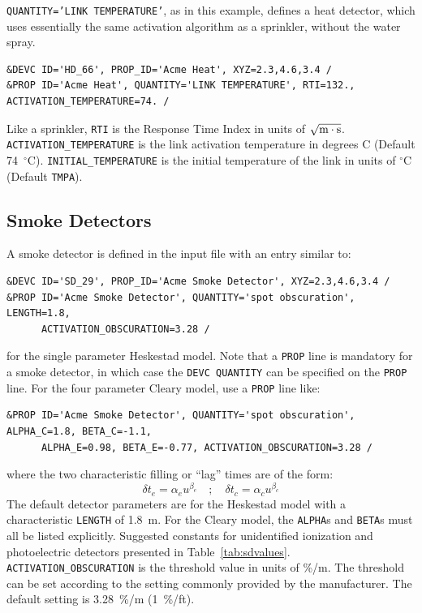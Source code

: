 \documentclass[11pt]{book}
\newcommand{\ct}{\tt\small}
\newcommand{\be}{\begin{equation}}
\newcommand{\ee}{\end{equation}}
\begin{document}
{\ct QUANTITY='LINK TEMPERATURE'}, as in this example, defines a heat detector, which uses essentially the same activation algorithm as a sprinkler, without the water spray.

\footnotesize
\begin{verbatim}
&DEVC ID='HD_66', PROP_ID='Acme Heat', XYZ=2.3,4.6,3.4 /
&PROP ID='Acme Heat', QUANTITY='LINK TEMPERATURE', RTI=132., ACTIVATION_TEMPERATURE=74. /
\end{verbatim}

\normalsize
\noindent
Like a sprinkler, {\ct RTI} is the Response Time Index in units of
$\sqrt{\hbox{m}\cdot \hbox{s}}$.
{\ct ACTIVATION\_TEMPERATURE} is the link activation temperature in degrees C (Default 74~$^\circ$C).
{\ct INITIAL\_TEMPERATURE} is the initial temperature of the link in units of $^\circ$C (Default {\ct TMPA}).



\subsection{Smoke Detectors}
\label{info:smoke_detector}

A smoke detector is defined in the input file with an entry similar to:

\footnotesize
\begin{verbatim}
&DEVC ID='SD_29', PROP_ID='Acme Smoke Detector', XYZ=2.3,4.6,3.4 /
&PROP ID='Acme Smoke Detector', QUANTITY='spot obscuration', LENGTH=1.8,
      ACTIVATION_OBSCURATION=3.28 /
\end{verbatim}

\normalsize
\noindent
for the single parameter Heskestad model. Note that a {\ct PROP} line is mandatory for a smoke detector, in which case the
{\ct DEVC QUANTITY} can be specified on the {\ct PROP} line. For the four parameter Cleary model, use a {\ct PROP} line like:

\footnotesize
\begin{verbatim}
&PROP ID='Acme Smoke Detector', QUANTITY='spot obscuration', ALPHA_C=1.8, BETA_C=-1.1,
      ALPHA_E=0.98, BETA_E=-0.77, ACTIVATION_OBSCURATION=3.28 /
\end{verbatim}

\normalsize
\noindent
where the two characteristic filling or ``lag'' times are of the form:
\be \delta t_e = \alpha_e u^{\beta_e} \quad ; \quad \delta t_c = \alpha_c u^{\beta_c} \ee
The default detector parameters are for the Heskestad model with a characteristic {\ct LENGTH} of
1.8~m. For the Cleary model, the {\ct ALPHA}s and {\ct BETA}s must all be listed explicitly.
Suggested constants for unidentified ionization and photoelectric detectors
presented in Table~\ref{tab:sdvalues}.
{\ct ACTIVATION\_OBSCURATION} is the threshold value in units of \%/m.
The threshold can be set according to the setting commonly provided by the manufacturer.
The default setting is 3.28~\%/m (1~\%/ft).
\end{document}
